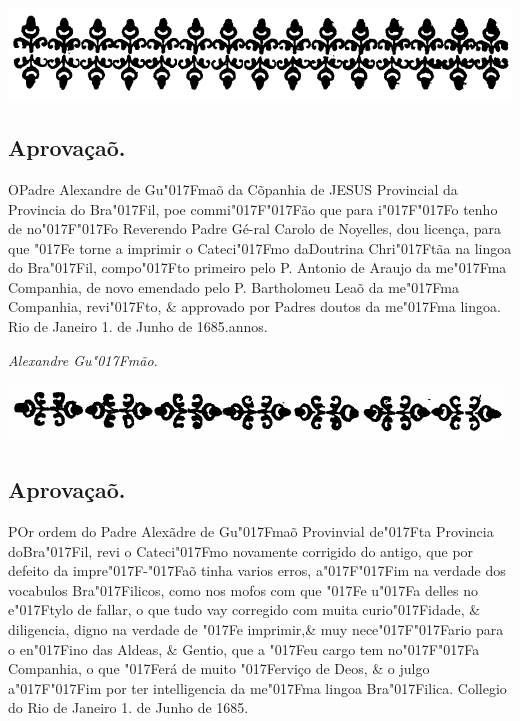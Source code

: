 \documentclass[openany,titlepage,12pt]{book}
\renewcommand{\chaptermark}[1]{\markboth{#1}{}}
\renewcommand{\sectionmark}[1]{\gdef\rightmark{#1}}
\newcommand{\lgS}{\char"017F}
\newcommand{\lgSS}{\char"017F\char"017F}
\begin{document}
\begin{center}
    \includegraphics[scale=0.20]{02-aos_religiosos.png}
\end{center}
\subsection{Aprovaçaõ.}
\chaptermark{}
\sectionmark{}

\lettrine[findent=2pt, nindent=0pt, lines=2]
{O}{}Padre Alexandre de Gu\lgS maõ da Cõpanhia de JESUS Provincial
da Provincia do Bra\lgS il, poe commi\lgSS ão que para i\lgSS o
tenho de no\lgSS o Reverendo Padre Gé-ral Carolo de Noyelles,
dou licença, para que \lgS e torne a imprimir o Cateci\lgS mo
da\linebreak Doutrina Chri\lgS tãa na lingoa do Bra\lgS il,
compo\lgS to primeiro pelo P. Antonio de Araujo da
me\lgS ma Companhia, de novo emendado pelo P. Bartholomeu
Leaõ da me\lgS ma Companhia, revi\lgS to, \&
approvado por Padres doutos da me\lgS ma lingoa.
Rio de Janeiro 1. de Junho de 1685.annos.

\begin{center}
    \hspace{60pt}\textit{Alexandre Gu\lgS mão.}
\end{center}
\newpage

\begin{center}
    \includegraphics[scale=0.33]{04.aprovacao2.png}
\end{center}
\subsection{Aprovaçaõ.}

\lettrine[findent=2pt, nindent=0pt, lines=2]
{P}{O}r ordem do Padre Alexãdre de Gu\lgS maõ Provinvial de\lgS ta
Provincia do\linebreak Bra\lgS il,
revi o Cateci\lgS mo novamente corrigido
do antigo, que por defeito da impre\lgS -\lgS aõ tinha varios erros,
a\lgSS im na verdade dos vocabulos Bra\lgS ilicos, como nos mofos
com que \lgS e u\lgS a delles no e\lgS tylo de fallar, o que tudo
vay corregido com muita curio\lgS idade, \& diligencia, digno na
verdade de \lgS e imprimir,\& muy nece\lgSS ario para o en\lgS ino
das Aldeas, \& Gentio, que a \lgS eu cargo tem no\lgSS a Companhia,
o que \lgS erá de muito \lgS erviço de Deos, \& o julgo a\lgSS im
por ter intelligencia da me\lgS ma lingoa Bra\lgS ilica. Collegio
do Rio de Janeiro 1. de Junho de 1685.
\end{document}
